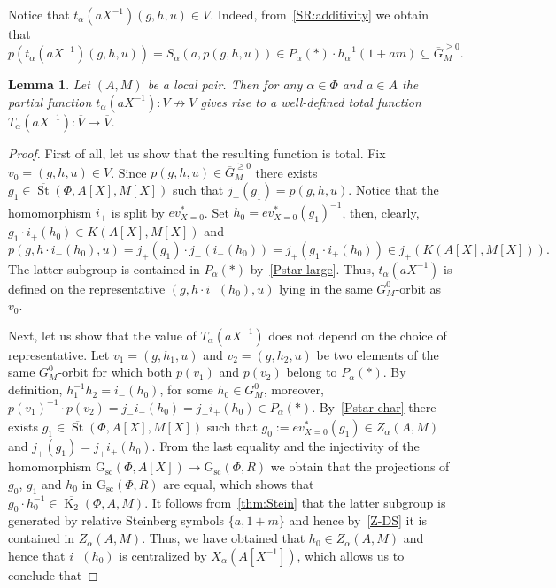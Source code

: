 \documentclass[10pt,a4paper,twoside]{article}
\newtheorem{lemma}{Lemma}
\theoremstyle{remark}
\theoremstyle{definition}
\numberwithin{lemma}{section}
\numberwithin{prop}{section}
\numberwithin{corollary}{section}
\numberwithin{externaltheorem}{section}
\DeclareMathOperator{\St}{St}
\DeclareMathOperator{\K}{K}
\newcommand{\GG}{\mathrm{G}_{\mathrm{sc}}}
\numberwithin{equation}{section}
\begin{document}
Notice that $t_\alpha(aX^{-1}) (g, h, u) \in V$. Indeed, from~\cref{SR:additivity} we obtain that
\[p\left(t_\alpha(aX^{-1}) (g, h, u)\right) = S_\alpha(a, p(g, h, u)) \in P_\alpha(*) \cdot h_{\alpha}^{-1}(1+am) \subseteq \overline{G}_M^{\geq 0}.\]
\begin{lemma}\label{lem:orbit-action} Let $(A, M)$ be a local pair. 
Then for any $\alpha \in \Phi$ and $a \in A$ the partial function $t_\alpha(aX^{-1}) \colon V \not \to V$ gives rise to a well-defined total function $T_\alpha(aX^{-1}) \colon \overline{V} \to \overline{V}$. \end{lemma}
\begin{proof}
 First of all, let us show that the resulting function is total. 
 Fix $v_0 = (g, h, u) \in V$. Since $p(g, h, u) \in \overline{G}^{\geq 0}_M$ there exists $g_1 \in \overline{\St}(\Phi, A[X], M[X])$ such that $j_+(g_1) = p(g, h, u).$ Notice that the homomorphism $i_+$ is split by $ev^*_{X=0}$.
 Set $h_0 = ev^*_{X=0}(g_1)^{-1}$, then, clearly, $g_1 \cdot i_+(h_0) \in K(A[X], M[X])$ and 
 $p(g, h \cdot i_-(h_0), u) = j_+(g_1) \cdot j_-(i_-(h_0)) = j_+(g_1 \cdot i_+(h_0)) \in j_+(K(A[X], M[X])).$ The latter subgroup is contained in $P_\alpha(*)$ by~\cref{Pstar-large}. Thus, $t_\alpha(aX^{-1})$ is defined on the representative $(g, h \cdot i_-(h_0), u)$ lying in the same $G_M^0$-orbit as $v_0$.
  
 Next, let us show that the value of $T_\alpha(aX^{-1})$ does not depend on the choice of representative.
 Let $v_1 = (g, h_1, u)$ and $v_2 = (g, h_2, u)$ be two elements of the same $G_M^0$-orbit for which both $p(v_1)$ and $p(v_2)$ belong to $P_\alpha(*)$.
 By definition, $h_1^{-1} h_2 = i_-(h_0)$, for some $h_0 \in G^0_M$, moreover, 
  $p(v_1)^{-1} \cdot p(v_2) = j_- i_-(h_0) = j_+ i_+(h_0) \in P_\alpha(*)$.
 By~\cref{Pstar-char} there exists $g_1 \in \overline{\St}(\Phi, A[X], M[X])$ such that $g_0 := ev^*_{X=0}(g_1) \in Z_\alpha(A, M)$ and $j_+(g_1) = j_+ i_+ (h_0)$.
 From the last equality and the injectivity of the homomorphism $\GG(\Phi, A[X]) \to \GG(\Phi, R)$ we obtain that the projections of $g_0$, $g_1$ and $h_0$ in $\GG(\Phi, R)$ are equal, which shows that $g_0 \cdot h_0^{-1} \in \overline{\K_2}(\Phi, A, M)$. It follows from~\cref{thm:Stein} that the latter subgroup is generated by relative Steinberg symbols $\{ a, 1 + m \}$ and hence by~\cref{Z-DS} it is contained in $Z_\alpha(A, M)$. Thus, we have obtained that $h_0 \in Z_\alpha(A, M)$ and hence that $i_-(h_0)$ is centralized by $X_\alpha(A[X^{-1}])$, which allows us to conclude that
 \newline {}\end{proof}
\end{document}
